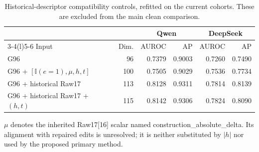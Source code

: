 \begin{table}[t]
\centering\small
\caption{Historical-descriptor compatibility controls, refitted on the current cohorts. These are excluded from the main clean comparison.}
\label{tab:legacy}
\setlength{\tabcolsep}{4pt}
\begin{tabular}{@{}lrrrrr@{}}
\toprule
& & \multicolumn{2}{c}{Qwen} & \multicolumn{2}{c}{DeepSeek}\\\cmidrule(lr){3-4}\cmidrule(l){5-6} Input & Dim. & AUROC & AP & AUROC & AP\\
\midrule
G96 & 96 & 0.7379 & 0.9003 & 0.7260 & 0.7490\\
G96 + $[\mathbb{I}(e=1),\mu,h,t]$ & 100 & 0.7505 & 0.9029 & 0.7536 & 0.7734\\
G96 + historical Raw17 & 113 & 0.8128 & 0.9311 & 0.7814 & 0.8139\\
G96 + historical Raw17 + $(h,t)$ & 115 & 0.8142 & 0.9306 & 0.7824 & 0.8090\\
\bottomrule
\end{tabular}
\par\vspace{3pt}\begin{minipage}{\textwidth}\footnotesize $\mu$ denotes the inherited Raw17[16] scalar named construction\_absolute\_delta. Its alignment with repaired edits is unresolved; it is neither substituted by $|h|$ nor used by the proposed primary method.\end{minipage}
\end{table}
